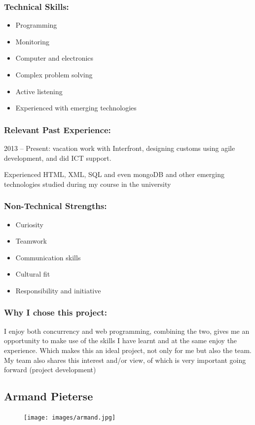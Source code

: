 \subsubsection{Technical Skills:}
	\begin{itemize}
		\item Programming
		\item Monitoring
		\item Computer and electronics 
		\item Complex problem solving
		\item Active listening
		\item Experienced with emerging technologies 
	\end{itemize}
	
\subsubsection{Relevant Past Experience:}
\par{2013 – Present: vacation work with Interfront, designing customs using agile development, and did ICT support.
}
\par{Experienced HTML, XML, SQL and even mongoDB and other emerging technologies studied during my course in the university
}
\subsubsection{Non-Technical Strengths:}
\begin{itemize}
		\item Curiosity
		\item Teamwork
		\item Communication skills
		\item Cultural fit
		\item Responsibility and initiative
	\end{itemize}
\subsubsection{Why I chose this project:}
\par{I enjoy both concurrency and web programming, combining the two, gives me an opportunity to make use of the skills I have learnt and at the same enjoy the experience. Which makes this an ideal project, not only for me but also the team. My team also shares this interest and/or view, of which is very important going forward (project development)
}

\newpage
\subsection{Armand Pieterse}
\begin{figure}[h]
			\center
			\texttt{[image: images/armand.jpg]}
\end{figure}
